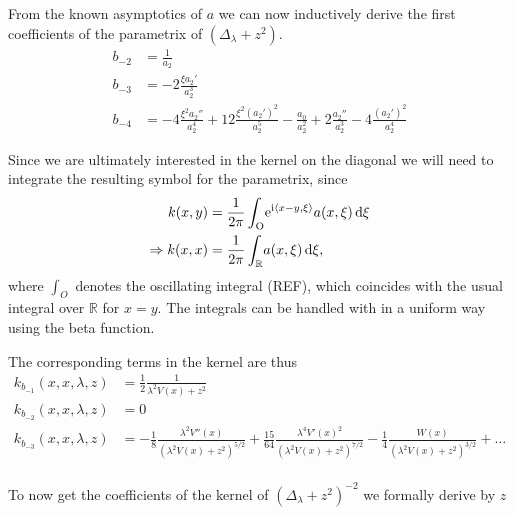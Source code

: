 From the known asymptotics of $a$ we can now inductively derive the first
coefficients of the parametrix of $(\Delta_\lambda + z^2)$.
\begin{align}
  b_{-2} &= \frac{1}{a_2} \\
  b_{-3} &= -2\frac{\xi a_2'}{a_2^3}\\
  b_{-4} &= -4\frac{\xi^2 a_2''}{a_2^4}
  + 12\frac{\xi^2 (a_2')^2}{a_2^5} - \frac{a_0}{a_2^2} +
  2\frac{a_2''}{a_2^3} -4\frac{(a_2')^2}{a_2^4}
  \label{eqn:coeff-symbol}
\end{align}

Since we are ultimately interested in the kernel on the diagonal we will need to
integrate the resulting symbol for the parametrix, since
\begin{align*}
    k(x,y) &= \frac{1}{2\pi}\int_{\mathrm O}^{}\!
        \mathrm e^{\mathrm i\left\langle x-y, \xi\right\rangle} a(x,\xi)
        \,\mathrm d{\xi} \\
    \Rightarrow k(x,x) &= \frac{1}{2\pi}\int_{\mathbb{R}}^{}\!a(x,\xi)\,\mathrm d{\xi},
\end{align*}
where $\int_{O}$ denotes the oscillating integral (REF), which coincides with
the usual integral over $\mathbb{R}$ for $x = y$. The integrals can be handled
with in a uniform way using the beta function. 

The corresponding terms in the kernel are thus
\begin{align}
  k_{b_{-1}}(x,x,\lambda,z) &= \frac{1}{2} \frac{1}{\lambda^2 V(x) + z^2} \\
  k_{b_{-2}}(x,x,\lambda,z) &= 0 \\
  k_{b_{-3}}(x,x,\lambda,z) &= -\frac{1}{8} \frac{\lambda^2 V''(x)}{(\lambda^2
    V(x) + z^2)^{5/2}} + \frac{15}{64} \frac{\lambda^4 V'(x)^2}{(\lambda^2V(x)
    + z^2)^{7/2}} -\frac{1}{4}\frac{W(x)}{(\lambda^2 V(x) + z^2)^{3/2}} + \ldots \\
  \label{eqn:coeff-kernel}
\end{align}

To now get the coefficients of the kernel of $(\Delta_\lambda + z^2)^{-2}$ we
formally derive by $z$


